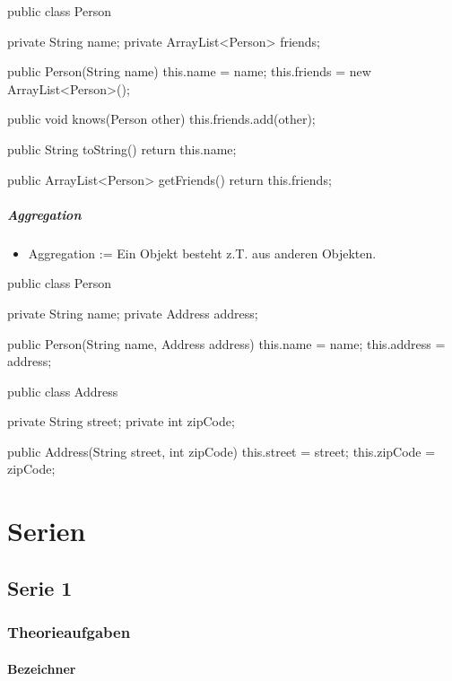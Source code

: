 \documentclass[a4paper,10pt, dvipsnames]{report}
\begin{document}
\begin{javacodebox}
public class Person {
	private String name;
	private ArrayList<Person> friends;

	public Person(String name) {
		this.name = name;
		this.friends = new ArrayList<Person>();
	}

	public void knows(Person other) {
		this.friends.add(other);
	}

	public String toString() {
		return this.name;
	}

	public ArrayList<Person> getFriends() {
		return this.friends;
	}
}
\end{javacodebox}

\subsubsection{Aggregation}

\begin{itemize}
	\item Aggregation := Ein Objekt besteht z.T. aus anderen Objekten.
\end{itemize}

\begin{javacodebox}
public class Person {
    private String name;
    private Address address;

    public Person(String name, Address address) {
        this.name = name;
        this.address = address;
    }
}

public class Address {
    private String street;
    private int zipCode;

    public Address(String street, int zipCode) {
        this.street = street;
        this.zipCode = zipCode;
    }
}
\end{javacodebox}





\part{Serien}
\chapter{Serie 1}
\section{Theorieaufgaben}

\subsection{Bezeichner}
\end{document}
